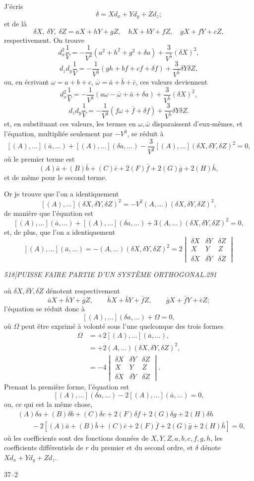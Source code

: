 \documentclass[11pt]{article}
\newcommand{\phead}[3]{\noindent\textit{#1\hfill #2\hfill #3}\par\medskip}
\newcommand{\D}{\delta}
\begin{document}
J'\'ecris
\[
\D=Xd_x+Yd_y+Zd_z;
\]
et de l\`a
\[
\D X,\ \D Y,\ \D Z=aX+hY+gZ,\quad hX+bY+fZ,\quad gX+fY+cZ,
\]
respectivement. On trouve
\[
d_x^2\frac{1}{V}=-\frac{1}{V^3}(a^2+h^2+g^2+\D a)+\frac{3}{V^5}(\D X)^2,
\]
\[
d_zd_y\frac{1}{V}=-\frac{1}{V^3}(gh+bf+cf+\D f)+\frac{3}{V^5}\D Y\D Z,
\]
ou, en \'ecrivant $\omega=a+b+c$, $\bar{\omega}=\bar{a}+\bar{b}+\bar{c}$, ces valeurs
deviennent
\[
d_x^2\frac{1}{V}=-\frac{1}{V^3}(a\omega-\bar{\omega}+\bar{a}+\D a)
  +\frac{3}{V^5}(\D X)^2,
\]
\[
d_zd_y\frac{1}{V}=-\frac{1}{V^3}(f\omega+\bar{f}+\D f)
  +\frac{3}{V^5}\D Y\D Z.
\]
et, en substituant ces valeurs, les termes en $\omega,\bar{\omega}$ disparaissent
d'eux-m\^emes, et l'\'equation, multipli\'ee seulement par $-V^3$, se r\'eduit \`a
\[
[(A),\ldots](\bar{a},\ldots)+[(A),\ldots](\D a,\ldots)
-\frac{3}{V^2}[(A),\ldots](\D X,\D Y,\D Z)^2=0,
\]
o\`u le premier terme est
\[
(A)\bar{a}+(B)\bar{b}+(C)\bar{c}+2(F)\bar{f}+2(G)\bar{g}+2(H)\bar{h},
\]
et de m\^eme pour le second terme.

Or je trouve que l'on a identiquement
\[
[(A),\ldots](\D X,\D Y,\D Z)^2
=-V^2(A,\ldots)(\D X,\D Y,\D Z)^2,
\]
de mani\`ere que l'\'equation est
\[
[(A),\ldots](\bar{a},\ldots)+[(A),\ldots](\D a,\ldots)
+3(A,\ldots)(\D X,\D Y,\D Z)^2=0,
\]
et, de plus, que l'on a identiquement
\[
[(A),\ldots](\bar{a},\ldots)=-(A,\ldots)(\D X,\D Y,\D Z)^2
=2\begin{vmatrix}
\D X&\D Y&\D Z\\
X&Y&Z\\
\overline{\D X}&\overline{\D Y}&\overline{\D Z}
\end{vmatrix}
\]

\clearpage

\phead{518]}{PUISSE FAIRE PARTIE D'UN SYST\`EME ORTHOGONAL.}{291}

o\`u $\overline{\D X},\overline{\D Y},\overline{\D Z}$ d\'enotent respectivement
\[
\bar{a}X+\bar{h}Y+\bar{g}Z,\qquad
\bar{h}X+\bar{b}Y+\bar{f}Z,\qquad
\bar{g}X+\bar{f}Y+\bar{c}Z;
\]
l'\'equation se r\'eduit donc \`a
\[
[(A),\ldots](\D a,\ldots)+\Omega=0,
\]
o\`u $\Omega$ peut \^etre exprim\'e \`a volont\'e sous l'une quelconque des trois formes
\[
\begin{aligned}
\Omega&=+2[(A),\ldots](\bar{a},\ldots),\\
&=+2(A,\ldots)(\D X,\D Y,\D Z)^2,\\
&=-4
\begin{vmatrix}
\D X&\D Y&\D Z\\
X&Y&Z\\
\overline{\D X}&\overline{\D Y}&\overline{\D Z}
\end{vmatrix}.
\end{aligned}
\]
Prenant la premi\`ere forme, l'\'equation est
\[
[(A),\ldots](\D a,\ldots)-2[(A),\ldots](\bar{a},\ldots)=0,
\]
ou, ce qui est la m\^eme chose,
\[
\begin{split}
&(A)\D a+(B)\D b+(C)\D c+2(F)\D f+2(G)\D g+2(H)\D h\\
&\qquad
-2[(A)\bar{a}+(B)\bar{b}+(C)\bar{c}
   +2(F)\bar{f}+2(G)\bar{g}+2(H)\bar{h}]=0,
\end{split}
\]
o\`u les coefficients sont des fonctions donn\'ees de $X,Y,Z,a,b,c,f,g,h$, les
coefficients diff\'erentiels de $r$ du premier et du second ordre, et $\D$ d\'enote
$Xd_x+Yd_y+Zd_z$.

\hfill 37--2
\end{document}
